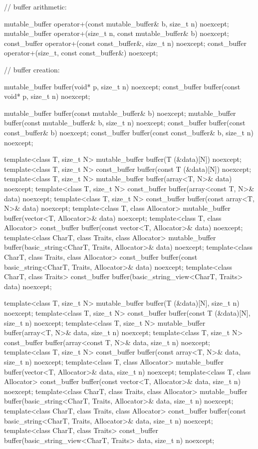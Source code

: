 \begin{codeblock}
{{{{  // buffer arithmetic:

  mutable_buffer operator+(const mutable_buffer& b, size_t n) noexcept;
  mutable_buffer operator+(size_t n, const mutable_buffer& b) noexcept;
  const_buffer operator+(const const_buffer&, size_t n) noexcept;
  const_buffer operator+(size_t, const const_buffer&) noexcept;

  // buffer creation:

  mutable_buffer buffer(void* p, size_t n) noexcept;
  const_buffer buffer(const void* p, size_t n) noexcept;

  mutable_buffer buffer(const mutable_buffer& b) noexcept;
  mutable_buffer buffer(const mutable_buffer& b, size_t n) noexcept;
  const_buffer buffer(const const_buffer& b) noexcept;
  const_buffer buffer(const const_buffer& b, size_t n) noexcept;

  template<class T, size_t N>
    mutable_buffer buffer(T (&data)[N]) noexcept;
  template<class T, size_t N>
    const_buffer buffer(const T (&data)[N]) noexcept;
  template<class T, size_t N>
    mutable_buffer buffer(array<T, N>& data) noexcept;
  template<class T, size_t N>
    const_buffer buffer(array<const T, N>& data) noexcept;
  template<class T, size_t N>
    const_buffer buffer(const array<T, N>& data) noexcept;
  template<class T, class Allocator>
    mutable_buffer buffer(vector<T, Allocator>& data) noexcept;
  template<class T, class Allocator>
    const_buffer buffer(const vector<T, Allocator>& data) noexcept;
  template<class CharT, class Traits, class Allocator>
    mutable_buffer buffer(basic_string<CharT, Traits, Allocator>& data) noexcept;
  template<class CharT, class Traits, class Allocator>
    const_buffer buffer(const basic_string<CharT, Traits, Allocator>& data) noexcept;
  template<class CharT, class Traits>
    const_buffer buffer(basic_string_view<CharT, Traits> data) noexcept;

  template<class T, size_t N>
    mutable_buffer buffer(T (&data)[N], size_t n) noexcept;
  template<class T, size_t N>
    const_buffer buffer(const T (&data)[N], size_t n) noexcept;
  template<class T, size_t N>
    mutable_buffer buffer(array<T, N>& data, size_t n) noexcept;
  template<class T, size_t N>
    const_buffer buffer(array<const T, N>& data, size_t n) noexcept;
  template<class T, size_t N>
    const_buffer buffer(const array<T, N>& data, size_t n) noexcept;
  template<class T, class Allocator>
    mutable_buffer buffer(vector<T, Allocator>& data, size_t n) noexcept;
  template<class T, class Allocator>
    const_buffer buffer(const vector<T, Allocator>& data, size_t n) noexcept;
  template<class CharT, class Traits, class Allocator>
    mutable_buffer buffer(basic_string<CharT, Traits, Allocator>& data,
                          size_t n) noexcept;
  template<class CharT, class Traits, class Allocator>
    const_buffer buffer(const basic_string<CharT, Traits, Allocator>& data,
                        size_t n) noexcept;
  template<class CharT, class Traits>
    const_buffer buffer(basic_string_view<CharT, Traits> data,
                        size_t n) noexcept;

}}}}
\end{codeblock}
